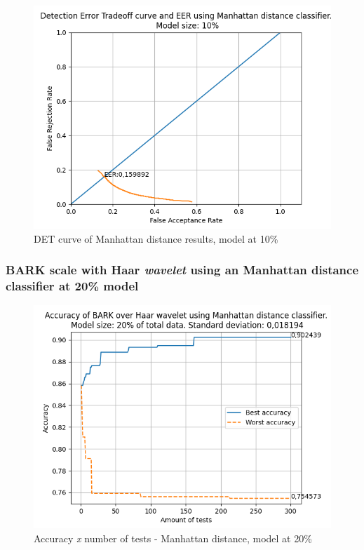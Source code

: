 			\begin{figure}[H]
				\centering
				\includegraphics[scale=.6]{images/results/det/DET_for_classifier_Manhattan_10}
				\caption{DET curve of Manhattan distance results, model at 10\%}
				\label{fig:detforclassifiermanhattan10}
			\end{figure}

			
		
		\subsubsection{BARK scale with Haar \textit{wavelet} using an Manhattan distance classifier at 20\% model}
			
			\begin{figure}[H]
				\centering
				\includegraphics[scale=.6]{images/results/confusionMatrices/classifier_Manhattan_20.png}
				\caption{Accuracy \textit{x} number of tests - Manhattan distance, model at 20\%}
				\label{fig:classifiermanhattan20}
			\end{figure}
			
